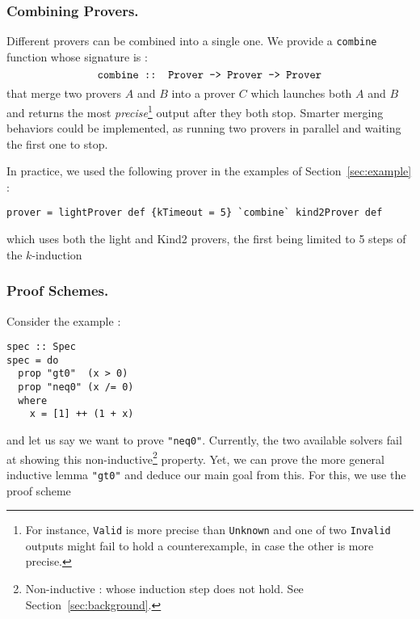 %


\subsubsection{Combining Provers.}\label{combining-provers}
Different provers can be combined into a single one. We provide a \texttt{combine} function whose signature is : $$\texttt{combine :: Prover -\textgreater{} Prover -\textgreater{} Prover}$$ that merge two provers $A$ and $B$ into a prover $C$ which
launches both $A$ and $B$ and returns the most \emph{precise}\footnote{For instance, \texttt{Valid} is more {precise} than \texttt{Unknown} and one of two \texttt{Invalid} outputs might fail to hold a counterexample, in case the other is more precise.} output after they both stop. Smarter merging behaviors could be implemented, as running two provers in parallel and waiting the first one to stop.

In practice, we used the following prover in the examples of Section~\ref{sec:example} :
\begin{lstlisting}[frame=single]
prover = lightProver def {kTimeout = 5} `combine` kind2Prover def
\end{lstlisting}
which uses both the light and Kind2 provers, the first being limited to 5 steps of the $k$-induction 

\subsubsection{Proof Schemes.}\label{proof-schemes}

Consider the example :
\begin{lstlisting}[frame=single]
spec :: Spec
spec = do
  prop "gt0"  (x > 0)
  prop "neq0" (x /= 0)
  where
    x = [1] ++ (1 + x)

\end{lstlisting}
and let us say we want to prove \texttt{"neq0"}. Currently, the two available solvers fail at showing this non-inductive\footnote{Non-inductive : whose induction step does not hold. See Section~\ref{sec:background}.} property. Yet, we can prove the more general
inductive lemma \texttt{"gt0"} and deduce our main goal from this. For
this, we use the proof scheme

